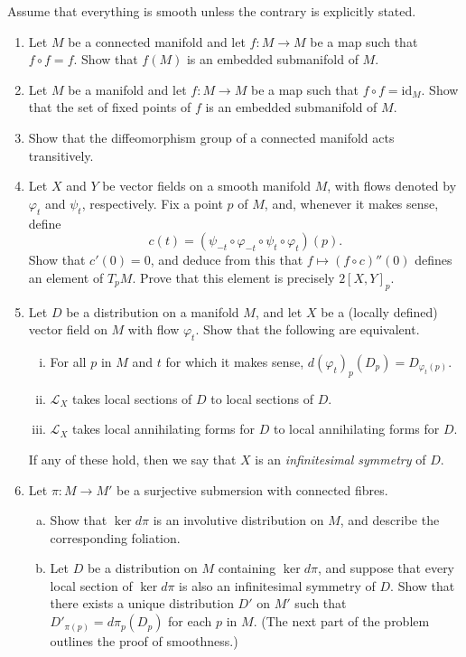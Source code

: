 \documentclass[11pt]{article} %
\begin{document}
Assume that everything is smooth unless the contrary is explicitly stated.

\begin{enumerate}
	\item Let $M$ be a connected manifold and let $f\colon M \to M$ be a map such that $f \circ f = f$. Show that $f(M)$ is an embedded submanifold of $M$. 

	\item Let $M$ be a manifold and let $f\colon M \to M$ be a map such that $f \circ f = \mathrm{id}_M$. Show that the set of fixed points of $f$ is an embedded submanifold of $M$.

	\item Show that the diffeomorphism group of a connected manifold acts transitively.

	\item Let $X$ and $Y$ be vector fields on a smooth manifold $M$, with flows denoted by $\varphi_t$ and $\psi_t$, respectively. Fix a point $p$ of $M$, and, whenever it makes sense, define
	\[
			c(t) = (\psi_{-t} \circ \varphi_{-t} \circ \psi_{t} \circ \varphi_{t})(p).
	\]
	Show that $c'(0) = 0$, and deduce from this that $f \mapsto (f \circ c)''(0)$ defines an element of $T_pM$. Prove that this element is precisely $2[X, Y]_p$. 

	\item Let $D$ be a distribution on a manifold $M$, and let $X$ be a (locally defined) vector field on $M$ with flow $\varphi_t$. Show that the following are equivalent.
	\begin{enumerate}[(i)]
		\item For all $p$ in $M$ and $t$ for which it makes sense, $d(\varphi_t)_p(D_p) = D_{\varphi_t(p)}$.
		\item $\mathcal{L}_X$ takes local sections of $D$ to local sections of $D$.
		\item $\mathcal{L}_X$ takes local annihilating forms for $D$ to local annihilating forms for $D$.
	\end{enumerate}
	If any of these hold, then we say that $X$ is an \emph{infinitesimal symmetry} of $D$.

	\item Let $\pi\colon M \to M'$ be a surjective submersion with connected fibres.
	\begin{enumerate}[(a)]
		\item Show that $\ker d\pi$ is an involutive distribution on $M$, and describe the corresponding foliation.
		\item Let $D$ be a distribution on $M$ containing $\ker d\pi$, and suppose that every local section of $\ker d\pi$ is also an infinitesimal symmetry of $D$. Show that there exists a unique distribution $D'$ on $M'$ such that $D'_{\pi(p)} = d\pi_p(D_p)$ for each $p$ in $M$. (The next part of the problem outlines the proof of smoothness.)


\end{enumerate}
\end{enumerate}
\end{document}
